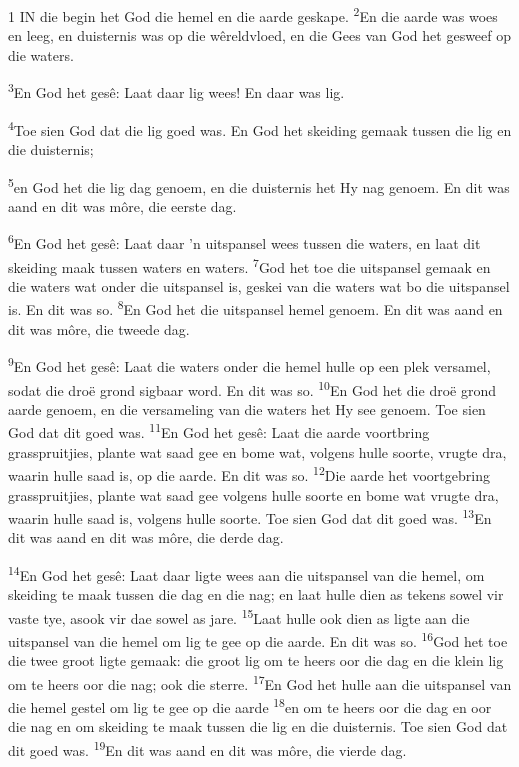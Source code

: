 \documentclass[10pt,oneside,a4paper]{memoir}
\renewcommand{\verse}[1]{\textsuperscript{#1}}
\def\biblsyntheticpar{\hfil\vadjust{\vskip\parskip}\break\indent}
\begin{document}
\setmainfont[Numbers=Uppercase]{Playfair Display}
\mainmatter
%
\begin{paracol}{2}
\lettrine[lines=4, findent=3pt, nindent=0pt]{1}{}
{}
\biblsyntheticpar
IN die begin het God die hemel en die aarde geskape.
\biblsyntheticpar
\verse{2}En die aarde was woes en leeg, en duisternis was op die wêreldvloed, en die Gees van God het gesweef op die waters.

\verse{3}En God het gesê: Laat daar lig wees! En daar was lig.

\verse{4}Toe sien God dat die lig goed was. En God het skeiding gemaak tussen die lig en die duisternis;

\verse{5}en God het die lig dag genoem, en die duisternis het Hy nag genoem. En dit was aand en dit was môre, die eerste dag.

\verse{6}En God het gesê: Laat daar ’n uitspansel wees tussen die waters, en laat dit skeiding maak tussen waters en waters.
\verse{7}God het toe die uitspansel gemaak en die waters wat onder die uitspansel is, geskei van die waters wat bo die uitspansel is. En dit was so.
\verse{8}En God het die uitspansel hemel genoem. En dit was aand en dit was môre, die tweede dag.

\verse{9}En God het gesê: Laat die waters onder die hemel hulle op een plek versamel, sodat die droë grond sigbaar word. En dit was so.
\verse{10}En God het die droë grond aarde genoem, en die versameling van die waters het Hy see genoem. Toe sien God dat dit goed was.
\verse{11}En God het gesê: Laat die aarde voortbring grasspruitjies, plante wat saad gee en bome wat, volgens hulle soorte, vrugte dra, waarin hulle saad is, op die aarde. En dit was so.
\verse{12}Die aarde het voortgebring grasspruitjies, plante wat saad gee volgens hulle soorte en bome wat vrugte dra, waarin hulle saad is, volgens hulle soorte. Toe sien God dat dit goed was.
\verse{13}En dit was aand en dit was môre, die derde dag.

\verse{14}En God het gesê: Laat daar ligte wees aan die uitspansel van die hemel, om skeiding te maak tussen die dag en die nag; en laat hulle dien as tekens sowel vir vaste tye, asook vir dae sowel as jare.
\verse{15}Laat hulle ook dien as ligte aan die uitspansel van die hemel om lig te gee op die aarde. En dit was so.
\verse{16}God het toe die twee groot ligte gemaak: die groot lig om te heers oor die dag en die klein lig om te heers oor die nag; ook die sterre.
\verse{17}En God het hulle aan die uitspansel van die hemel gestel om lig te gee op die aarde
\verse{18}en om te heers oor die dag en oor die nag en om skeiding te maak tussen die lig en die duisternis. Toe sien God dat dit goed was.
\verse{19}En dit was aand en dit was môre, die vierde dag.


\end{paracol}
\end{document}

